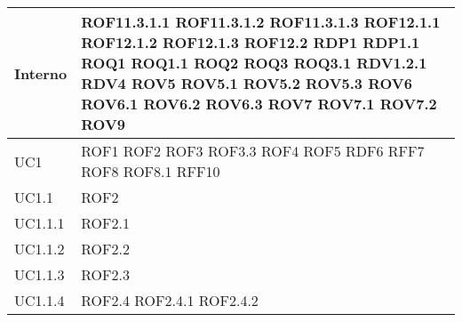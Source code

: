 \begin{center}
\begin{longtable}{| p{4cm} | p{4cm} |}
\hline
Interno & ROF11.3.1.1 \newline ROF11.3.1.2 \newline ROF11.3.1.3 \newline ROF12.1.1 \newline ROF12.1.2 \newline ROF12.1.3 \newline ROF12.2 \newline RDP1 \newline RDP1.1 \newline ROQ1 \newline ROQ1.1 \newline ROQ2 \newline ROQ3 \newline ROQ3.1 \newline RDV1.2.1 \newline RDV4 \newline ROV5 \newline ROV5.1 \newline ROV5.2 \newline ROV5.3 \newline ROV6 \newline ROV6.1 \newline ROV6.2 \newline ROV6.3 \newline ROV7 \newline ROV7.1 \newline ROV7.2 \newline ROV9 \newline \\
\hline
UC1 & ROF1 \newline ROF2 \newline ROF3 \newline ROF3.3 \newline ROF4 \newline ROF5 \newline RDF6 \newline RFF7 \newline ROF8 \newline ROF8.1 \newline RFF10 \\
\hline
UC1.1 & ROF2 \\
\hline
UC1.1.1 & ROF2.1 \\
\hline
UC1.1.2 & ROF2.2 \\
\hline
UC1.1.3 & ROF2.3 \\
\hline
UC1.1.4 & ROF2.4 \newline ROF2.4.1 \newline ROF2.4.2 \\

\end{longtable}
\end{center}
